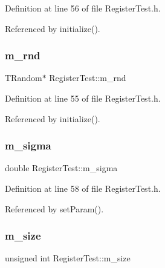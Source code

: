 Definition at line 56 of file Register\+Test.\+h.



Referenced by initialize().

\mbox{\label{classRegisterTest_a07e35817b07d61e54caa694d2a0fa210}} 
\subsubsection{\texorpdfstring{m\+\_\+rnd}{m\_rnd}}
{\footnotesize\ttfamily T\+Random$\ast$ Register\+Test\+::m\+\_\+rnd\hspace{0.3cm}{\ttfamily [private]}}



Definition at line 55 of file Register\+Test.\+h.



Referenced by initialize().

\mbox{\label{classRegisterTest_a17f1f3646bf00ae7ab6744afca9e6813}} 
\subsubsection{\texorpdfstring{m\+\_\+sigma}{m\_sigma}}
{\footnotesize\ttfamily double Register\+Test\+::m\+\_\+sigma\hspace{0.3cm}{\ttfamily [private]}}



Definition at line 58 of file Register\+Test.\+h.



Referenced by set\+Param().

\mbox{\label{classRegisterTest_ab543b709d593b4ae36c628c60da76923}} 
\subsubsection{\texorpdfstring{m\+\_\+size}{m\_size}}
{\footnotesize\ttfamily unsigned int Register\+Test\+::m\+\_\+size\hspace{0.3cm}{\ttfamily [private]}}



